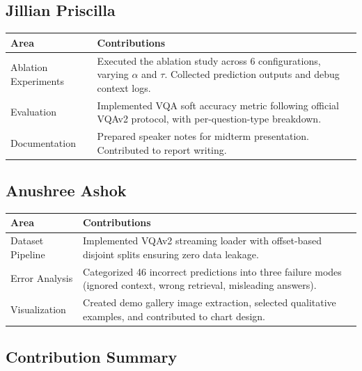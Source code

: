 \documentclass[12pt, a4paper]{article}
\begin{document}
\subsection{Jillian Priscilla}

\begin{table}[H]
\centering
\renewcommand{\arraystretch}{1.3}
\begin{tabularx}{\textwidth}{@{} l X @{}}
\toprule
\textbf{Area} & \textbf{Contributions} \\
\midrule
Ablation Experiments & Executed the ablation study across 6 configurations, varying $\alpha$ and $\tau$. Collected prediction outputs and debug context logs. \\
\addlinespace
Evaluation & Implemented VQA soft accuracy metric following official VQAv2 protocol, with per-question-type breakdown. \\
\addlinespace
Documentation & Prepared speaker notes for midterm presentation. Contributed to report writing. \\
\bottomrule
\end{tabularx}
\end{table}

\subsection{Anushree Ashok}

\begin{table}[H]
\centering
\renewcommand{\arraystretch}{1.3}
\begin{tabularx}{\textwidth}{@{} l X @{}}
\toprule
\textbf{Area} & \textbf{Contributions} \\
\midrule
Dataset Pipeline & Implemented VQAv2 streaming loader with offset-based disjoint splits ensuring zero data leakage. \\
\addlinespace
Error Analysis & Categorized 46 incorrect predictions into three failure modes (ignored context, wrong retrieval, misleading answers). \\
\addlinespace
Visualization & Created demo gallery image extraction, selected qualitative examples, and contributed to chart design. \\
\bottomrule
\end{tabularx}
\end{table}

\subsection{Contribution Summary}
\end{document}
